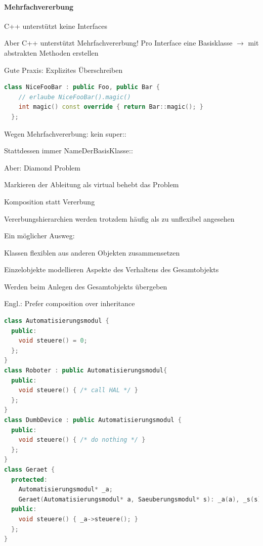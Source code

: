 \documentclass[10pt]{article}
\begin{document}
\paragraph{Mehrfachvererbung}

\begin{itemize*}
  \item C++ unterstützt keine Interfaces
  \item Aber C++ unterstützt Mehrfachvererbung! Pro Interface eine Basisklasse $\rightarrow$ mit abstrakten Methoden erstellen
  \item Gute Praxis: Explizites Überschreiben
  \begin{lstlisting}[language=C++]
  class NiceFooBar : public Foo, public Bar {
    // erlaube NiceFooBar().magic()
    int magic() const override { return Bar::magic(); }
  };
  \end{lstlisting}
  \begin{itemize*}
    \item Wegen Mehrfachvererbung: kein super::
    \item Stattdessen immer NameDerBasisKlasse::
  \end{itemize*}
  \item Aber: Diamond Problem
  \begin{itemize*}
    \item Markieren der Ableitung als virtual behebt das Problem
  \end{itemize*}
\end{itemize*}

Komposition statt Vererbung
\begin{itemize*}
  \item Vererbungshierarchien werden trotzdem häufig als zu unflexibel angesehen
  \item Ein möglicher Ausweg:
  \begin{itemize*}
    \item Klassen flexiblen aus anderen Objekten zusammensetzen
    \item Einzelobjekte modellieren Aspekte des Verhaltens des Gesamtobjekts
    \item Werden beim Anlegen des Gesamtobjekts übergeben
  \end{itemize*}
  \item Engl.: Prefer composition over inheritance
\end{itemize*}

\begin{lstlisting}[language=C++]
class Automatisierungsmodul {
  public:
    void steuere() = 0;
  };
}
class Roboter : public Automatisierungsmodul{
  public:
    void steuere() { /* call HAL */ }
  };
}
class DumbDevice : public Automatisierungsmodul {
  public:
    void steuere() { /* do nothing */ }
  };
}
class Geraet {
  protected:
    Automatisierungsmodul* _a;
    Geraet(Automatisierungsmodul* a, Saeuberungsmodul* s): _a(a), _s(s) {}
  public:
    void steuere() { _a->steuere(); }
  };
}
\end{lstlisting}
\end{document}
